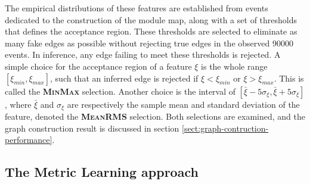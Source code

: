 The empirical distributions of these features are established from events dedicated to the construction of the module map, along with a set of thresholds that defines the acceptance region. 
These thresholds are selected to eliminate as many fake edges as possible without rejecting true edges in the observed 90000 events. 
In inference, any edge failing to meet these thresholds is rejected. 
A simple choice for the acceptance region of a feature $\xi$ is the whole range $[\xi_{min}, \xi_{max}]$, such that an inferred edge is rejected if $\xi < \xi_{min}$ or $\xi>\xi_{max}$. 
This is called the \textbf{\textsc{MinMax}} selection. 
Another choice is the interval of $[\bar{\xi} - 5\sigma_{\xi}, \bar{\xi}+5\sigma_{\xi}]$, where $\bar{\xi}$ and $\sigma_{\xi}$ are respectively the sample mean and standard deviation of the feature, denoted the \textbf{\textsc{MeanRMS}} selection. 
Both selections are examined, and the graph construction result is discussed in section \ref{sect:graph-contruction-performance}.

\subsection{The Metric Learning approach}
\label{subsect:metric-learning}

